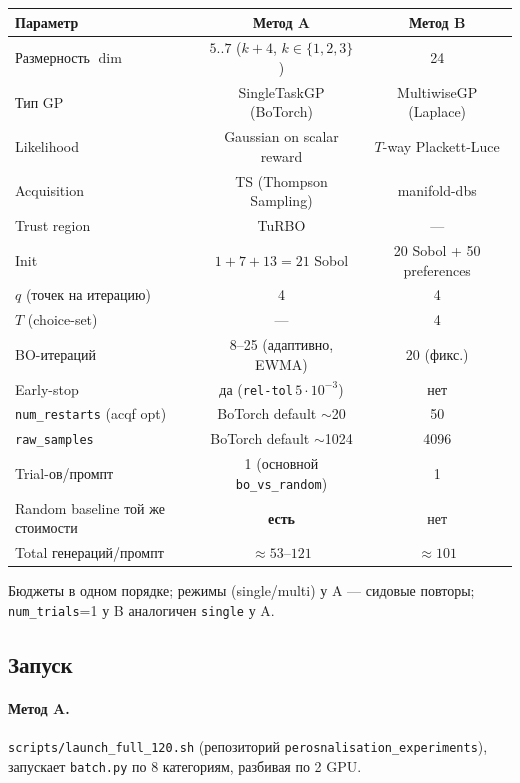 \documentclass[11pt,a4paper]{article}
\begin{document}
\begin{center}
\renewcommand{\arraystretch}{1.05}
\footnotesize
\begin{tabular}{lcc}
\toprule
Параметр & Метод A & Метод B \\
\midrule
Размерность $\dim$         & $5..7$ ($k+4$, $k\in\{1,2,3\}$) & 24 \\
Тип GP                     & SingleTaskGP (BoTorch) & MultiwiseGP (Laplace) \\
Likelihood                 & Gaussian on scalar reward & $T$-way Plackett-Luce \\
Acquisition                & TS (Thompson Sampling) & manifold-dbs \\
Trust region               & TuRBO & --- \\
Init                       & $1+7+13 = 21$ Sobol & 20 Sobol + 50 preferences \\
$q$ (точек на итерацию)    & 4 & 4 \\
$T$ (choice-set)           & --- & 4 \\
BO-итераций                & 8--25 (адаптивно, EWMA) & 20 (фикс.) \\
Early-stop                 & да (\texttt{rel-tol}\,$5{\cdot}10^{-3}$) & нет \\
\texttt{num\_restarts} (acqf opt) & BoTorch default $\sim$20 & 50 \\
\texttt{raw\_samples}             & BoTorch default $\sim$1024 & 4096 \\
Trial-ов/промпт            & 1 (основной \texttt{bo\_vs\_random}) & 1 \\
Random baseline той же стоимости & \textbf{есть} & нет \\
Total генераций/промпт     & $\approx 53\text{--}121$ & $\approx 101$ \\
\bottomrule
\end{tabular}
\end{center}

Бюджеты в одном порядке; режимы (single/multi) у A --- сидовые повторы;
\texttt{num\_trials}=1 у B аналогичен \texttt{single} у A.

\subsection{Запуск}

\paragraph{Метод A.} \texttt{scripts/launch\_full\_120.sh} (репозиторий
\texttt{perosnalisation\_experiments}), запускает \texttt{batch.py} по
8 категориям, разбивая по 2 GPU.
\end{document}
